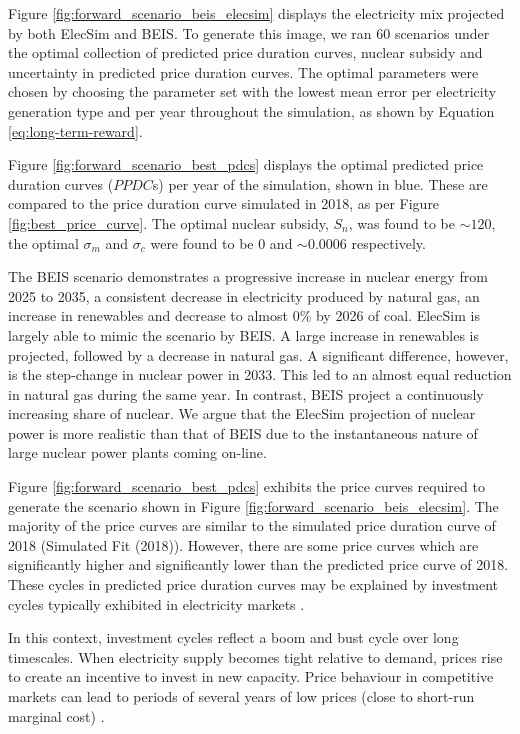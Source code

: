 Figure \ref{fig:forward_scenario_beis_elecsim} displays the electricity mix projected by both ElecSim and BEIS. To generate this image, we ran 60 scenarios under the optimal collection of predicted price duration curves, nuclear subsidy and uncertainty in predicted price duration curves. The optimal parameters were chosen by choosing the parameter set with the lowest mean error per electricity generation type and per year throughout the simulation, as shown by Equation \ref{eq:long-term-reward}.


Figure \ref{fig:forward_scenario_best_pdcs} displays the optimal predicted price duration curves ($PPDC$s) per year of the simulation, shown in blue. These are compared to the price duration curve simulated in 2018, as per Figure \ref{fig:best_price_curve}. The optimal nuclear subsidy, $S_n$, was found to be ${\sim}$\textsterling $120$, the optimal $\sigma_m$ and $\sigma_c$ were found to be $0$ and ${\sim}0.0006$ respectively.

The BEIS scenario demonstrates a progressive increase in nuclear energy from 2025 to 2035, a consistent decrease in electricity produced by natural gas, an increase in renewables and decrease to almost 0\% by 2026 of coal. ElecSim is largely able to mimic the scenario by BEIS. A large increase in renewables is projected, followed by a decrease in natural gas. A significant difference, however, is the step-change in nuclear power in 2033. This led to an almost equal reduction in natural gas during the same year. In contrast, BEIS project a continuously increasing share of nuclear. We argue that the ElecSim projection of nuclear power is more realistic than that of BEIS due to the instantaneous nature of large nuclear power plants coming on-line.

Figure \ref{fig:forward_scenario_best_pdcs} exhibits the price curves required to generate the scenario shown in Figure \ref{fig:forward_scenario_beis_elecsim}. The majority of the price curves are similar to the simulated price duration curve of 2018 (Simulated Fit (2018)). However, there are some price curves which are significantly higher and significantly lower than the predicted price curve of 2018. These cycles in predicted price duration curves may be explained by investment cycles typically exhibited in electricity markets \cite{Gross2007}. 

In this context, investment cycles reflect a boom and bust cycle over long timescales. When electricity supply becomes tight relative to demand, prices rise to create an incentive to invest in new capacity. Price behaviour in competitive markets can lead to periods of several years of low prices (close to short-run marginal cost) \cite{white2005concentrated}. 

